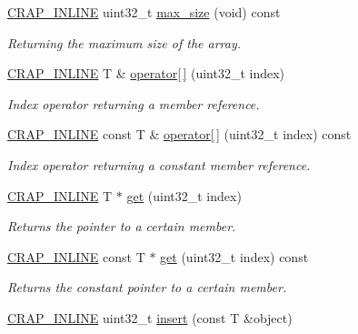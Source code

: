 \begin{DoxyCompactItemize}
\item 
\hyperlink{config__x86_8h_a5a40526b8d842e7ff731509998bb0f1c}{C\+R\+A\+P\+\_\+\+I\+N\+L\+I\+N\+E} uint32\+\_\+t \hyperlink{classcrap_1_1sorted__array_a13a95ae7b2941347d60cb984c9e39a16}{max\+\_\+size} (void) const 
\begin{DoxyCompactList}\small\item\em Returning the maximum size of the array. \end{DoxyCompactList}\item 
\hyperlink{config__x86_8h_a5a40526b8d842e7ff731509998bb0f1c}{C\+R\+A\+P\+\_\+\+I\+N\+L\+I\+N\+E} T \& \hyperlink{classcrap_1_1sorted__array_a7e79056988befaef9bafaf83b889f39c}{operator\mbox{[}$\,$\mbox{]}} (uint32\+\_\+t index)
\begin{DoxyCompactList}\small\item\em Index operator returning a member reference. \end{DoxyCompactList}\item 
\hyperlink{config__x86_8h_a5a40526b8d842e7ff731509998bb0f1c}{C\+R\+A\+P\+\_\+\+I\+N\+L\+I\+N\+E} const T \& \hyperlink{classcrap_1_1sorted__array_a51bb152c1698d83bca43b2be14489098}{operator\mbox{[}$\,$\mbox{]}} (uint32\+\_\+t index) const 
\begin{DoxyCompactList}\small\item\em Index operator returning a constant member reference. \end{DoxyCompactList}\item 
\hyperlink{config__x86_8h_a5a40526b8d842e7ff731509998bb0f1c}{C\+R\+A\+P\+\_\+\+I\+N\+L\+I\+N\+E} T $\ast$ \hyperlink{classcrap_1_1sorted__array_ad7ad4afd75618637a3ce602c9ef35c53}{get} (uint32\+\_\+t index)
\begin{DoxyCompactList}\small\item\em Returns the pointer to a certain member. \end{DoxyCompactList}\item 
\hyperlink{config__x86_8h_a5a40526b8d842e7ff731509998bb0f1c}{C\+R\+A\+P\+\_\+\+I\+N\+L\+I\+N\+E} const T $\ast$ \hyperlink{classcrap_1_1sorted__array_ab2794eb1badb682879d1e7e26bef4fa6}{get} (uint32\+\_\+t index) const 
\begin{DoxyCompactList}\small\item\em Returns the constant pointer to a certain member. \end{DoxyCompactList}\item 
\hyperlink{config__x86_8h_a5a40526b8d842e7ff731509998bb0f1c}{C\+R\+A\+P\+\_\+\+I\+N\+L\+I\+N\+E} uint32\+\_\+t \hyperlink{classcrap_1_1sorted__array_a7b6e539b39a094c918f3c3f60749eab6}{insert} (const T \&object)

\end{DoxyCompactItemize}
